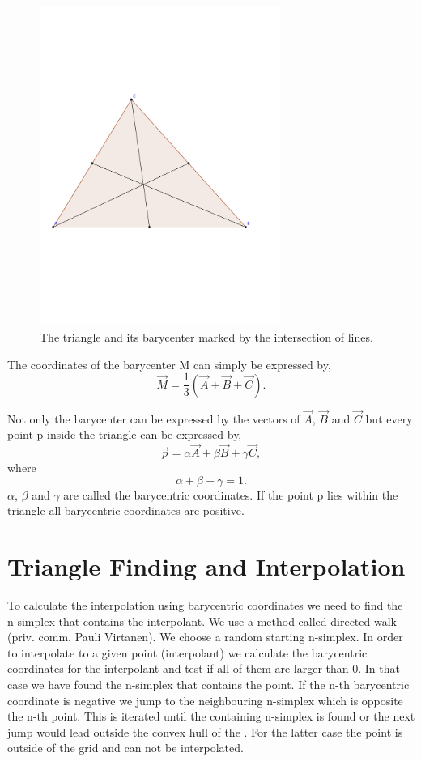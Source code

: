 \begin{figure}[htbp] %
   \centering
   \includegraphics[width=0.7\textwidth]{chapter_ndinterp/plots/barycenter.pdf}
   \caption{The triangle and its barycenter marked by the intersection of lines. }
   \label{fig:tri_barycenter}
\end{figure}


The coordinates of the barycenter M can simply be expressed by,
\[
\vec{M} = \frac{1}{3} (\vec{A} + \vec{B} + \vec{C}).
\]

Not only the barycenter can be expressed by the vectors of $\vec{A}$, $\vec{B}$ and $\vec{C}$ but every point p inside the triangle can be expressed by,
\[
\vec{p} = \alpha\vec{A} + \beta\vec{B} + \gamma\vec{C},
\]
where
\[
\alpha + \beta + \gamma = 1.
\]
$\alpha$, $\beta$ and $\gamma$ are called the barycentric coordinates. If the point p lies within the triangle all barycentric coordinates are positive. 

\section{Triangle Finding and Interpolation}

To calculate the interpolation using barycentric coordinates we need to find the n-simplex that contains the interpolant. We use a method called directed walk (priv. comm. Pauli Virtanen).  We choose a random starting n-simplex. In order to interpolate to a given point (interpolant) we calculate the barycentric coordinates for the interpolant and test if all of them are larger than 0. In that case  we have found the n-simplex that contains the point. 
If the n-th barycentric coordinate is negative we jump to the neighbouring n-simplex which is opposite the n-th point. This is iterated until the containing n-simplex is found or the next jump would lead outside the convex hull of the \deltri. For the latter case the point is outside of the grid and can not be interpolated.

